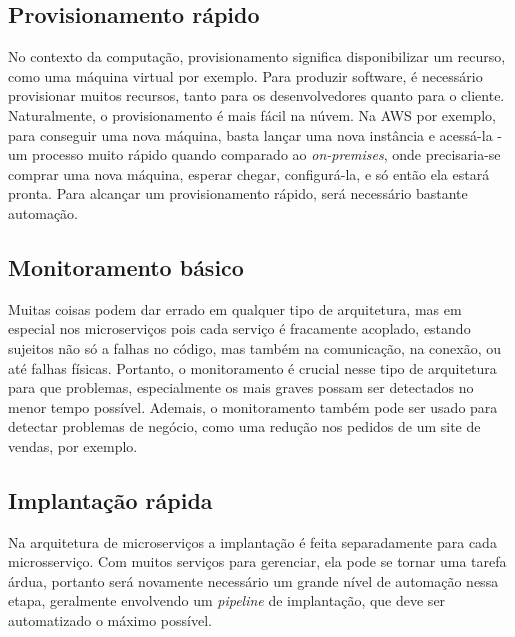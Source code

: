 
\subsection{Provisionamento rápido}\label{boas-praticas-provisionamento-rapido}

No contexto da computação, provisionamento significa disponibilizar um recurso, como uma máquina virtual por exemplo. Para produzir software, é necessário provisionar muitos recursos, tanto para os desenvolvedores quanto para o cliente. Naturalmente, o provisionamento é mais fácil na núvem. Na AWS por exemplo, para conseguir uma nova máquina, basta lançar uma nova instância e acessá-la - um processo muito rápido quando comparado ao \emph{on-premises}, onde precisaria-se comprar uma nova máquina, esperar chegar, configurá-la, e só então ela estará pronta. Para alcançar um provisionamento rápido, será necessário bastante automação. \cite{MartinFowlerMicroservicesPrereq}

\subsection{Monitoramento básico}\label{boas-praticas-monitoramento-basico}

Muitas coisas podem dar errado em qualquer tipo de arquitetura, mas em especial nos microserviços pois cada serviço é fracamente acoplado, estando sujeitos não só a falhas no código, mas também na comunicação, na conexão, ou até falhas físicas. Portanto, o monitoramento é crucial nesse tipo de arquitetura para que problemas, especialmente os mais graves possam ser detectados no menor tempo possível. Ademais, o monitoramento também pode ser usado para detectar problemas de negócio, como uma redução nos pedidos de um site de vendas, por exemplo. \cite{MartinFowlerMicroservicesPrereq}

\subsection{Implantação rápida}\label{boas-praticas-implantacao-rapida}

Na arquitetura de microserviços a implantação é feita separadamente para cada microsserviço. Com muitos serviços para gerenciar, ela pode se tornar uma tarefa árdua, portanto será novamente necessário um grande nível de automação nessa etapa, geralmente envolvendo um \emph{pipeline} de implantação, que deve ser automatizado o máximo possível. \cite{MartinFowlerMicroservicesPrereq}

